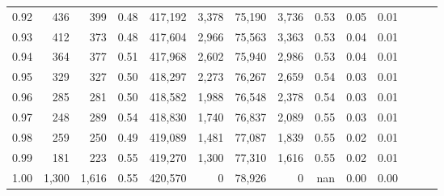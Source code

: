 \begin{tabular}{rrrrrrrrrrrrrr}
0.92 &    436 &    399 &  0.48 &  417,192 &    3,378 &  75,190 &   3,736 &  0.53 &  0.05 &      0.01 \\
0.93 &    412 &    373 &  0.48 &  417,604 &    2,966 &  75,563 &   3,363 &  0.53 &  0.04 &      0.01 \\
0.94 &    364 &    377 &  0.51 &  417,968 &    2,602 &  75,940 &   2,986 &  0.53 &  0.04 &      0.01 \\
0.95 &    329 &    327 &  0.50 &  418,297 &    2,273 &  76,267 &   2,659 &  0.54 &  0.03 &      0.01 \\
0.96 &    285 &    281 &  0.50 &  418,582 &    1,988 &  76,548 &   2,378 &  0.54 &  0.03 &      0.01 \\
0.97 &    248 &    289 &  0.54 &  418,830 &    1,740 &  76,837 &   2,089 &  0.55 &  0.03 &      0.01 \\
0.98 &    259 &    250 &  0.49 &  419,089 &    1,481 &  77,087 &   1,839 &  0.55 &  0.02 &      0.01 \\
0.99 &    181 &    223 &  0.55 &  419,270 &    1,300 &  77,310 &   1,616 &  0.55 &  0.02 &      0.01 \\
1.00 &  1,300 &  1,616 &  0.55 &  420,570 &        0 &  78,926 &       0 &   nan &  0.00 &      0.00 \\
\bottomrule
\end{tabular}
